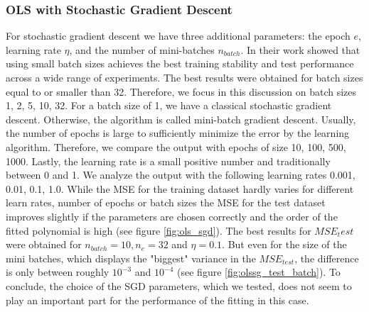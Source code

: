 \subsubsection{OLS with Stochastic Gradient Descent}
For stochastic gradient descent we have three additional parameters: the epoch $e$, learning rate $\eta$, and the number of mini-batches $n_{batch}$. In their work \cite{masters_revisiting_2018} showed that using small batch sizes achieves the best training stability and test performance across a wide range of experiments. The best results were obtained for batch sizes equal to or smaller than 32. Therefore, we focus in this discussion on batch sizes 1, 2, 5, 10, 32. For a batch size of 1, we have a classical stochastic gradient descent. Otherwise, the algorithm is called mini-batch gradient descent. Usually, the number of epochs is large to sufficiently minimize the error by the learning algorithm. Therefore, we compare the output with epochs of size 10, 100, 500, 1000. Lastly, the learning rate is a small positive number and traditionally between 0 and 1. We analyze the output with the following learning rates 0.001, 0.01, 0.1, 1.0. \newline \newline
While the MSE for the training dataset hardly varies for different learn rates, number of epochs or batch sizes the MSE for the test dataset improves slightly if the parameters are chosen correctly and the order of the fitted polynomial is high (see figure \ref{fig:ols_sgd}). The best results for $MSE_test$ were obtained for $n_{batch}=10, n_e=32$ and $\eta=0.1$. But even for the size of the mini batches, which displays the "biggest" variance in the $MSE_{test}$, the difference is only between roughly $10^{-3}$ and $10^{-4}$ (see figure \ref{fig:olssg_test_batch}). To conclude, the choice of the SGD parameters, which we tested, does not seem to play an important part for the performance of the fitting in this case.

